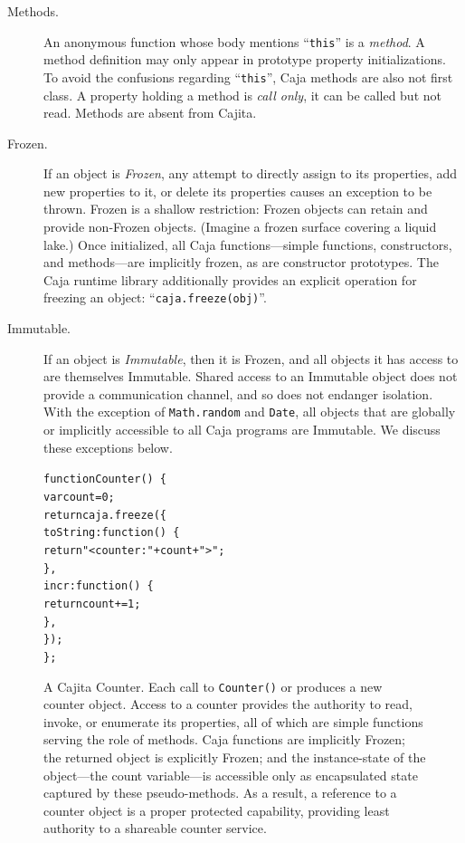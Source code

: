 \documentclass[letterpaper,twocolumn,10pt]{article}
\newcommand{\code}[1]{{\tt {#1}}}              %
\begin{document}
\begin{description}
  \item[Methods.] An anonymous function whose body mentions ``\code{this}'' 
  is a \emph{method}. A method definition may only appear in prototype 
  property initializations. To avoid the confusions regarding 
  ``\code{this}'', Caja methods are also not first class. A property holding 
  a method is \emph{call only}, it can be called but not read. Methods are 
  absent from Cajita.
  
  \item[Frozen.] If an object is \emph{Frozen}, any attempt to directly 
  assign to its properties, add new properties to it, or delete its 
  properties causes an exception to be thrown. Frozen is a shallow 
  restriction: Frozen objects can retain and provide non-Frozen objects. 
  (Imagine a frozen surface covering a liquid lake.) Once initialized, all 
  Caja functions---simple functions, constructors, and methods---are 
  implicitly frozen, as are constructor prototypes. The Caja runtime library 
  additionally provides an explicit operation for freezing an object: 
  ``\code{caja.freeze(obj)}''.
  
  \item[Immutable.] If an object is \emph{Immutable}, then it is Frozen, and 
  all objects it has access to are themselves Immutable. Shared access to an 
  Immutable object does not provide a communication channel, and so does not 
  endanger isolation. With the exception of \code{Math.random} and 
  \code{Date}, all objects that are globally or implicitly accessible to all 
  Caja programs are Immutable. We discuss these exceptions below.  

\end{description}

\begin{figure}
\begin{alltt}
function Counter()\ \{
  var count = 0;
  return caja.freeze(\{
    toString: function()\ \{ 
      return "<counter: " + count + ">"; 
    \},
    incr: function()\ \{ 
      return count += 1; 
    \},
  \});
\};
\end{alltt}

\caption[A Cajita Counter.]{A Cajita Counter. Each call to \code{Counter()} 
or produces a new counter object. Access to a counter provides the authority 
to read, invoke, or enumerate its properties, all of which are simple 
functions serving the role of methods. Caja functions are implicitly Frozen; 
the returned object is explicitly Frozen; and the instance-state of the 
object---the count variable---is accessible only as encapsulated state 
captured by these pseudo-methods. As a result, a reference to a counter 
object is a proper protected capability, providing least authority to a 
shareable counter service.}
\label{fig:cajita-counter}
\end{figure}
\end{document}
